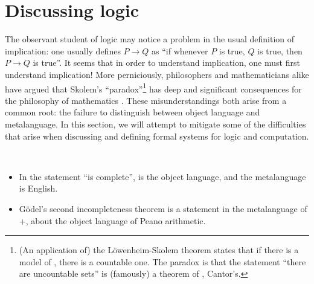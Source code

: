 \documentclass[12pt,twoside]{reedthesis}
\let\oldindex\index
\renewcommand{\index}[1]
               {\oldindex{#1}\marginpar{\footnotesize\color{index}index: #1}}
\newcommand{\define}[1]{\textbf{#1}} %
\newtheorem{notation}[theorem]{Notation}
\begin{document}

\section{Discussing logic}
\label{sec:discussing-logic}

The observant student of logic may notice a problem in the usual definition of
implication: one usually defines $P→ Q$ as ``if whenever $P$ is true,
$Q$ is true, then $P→ Q$ is true''. It seems that in order to understand
implication, one must first understand implication! More perniciously,
philosophers and mathematicians alike have argued that Skolem's
``paradox''\footnote{(An application of) the L\"owenheim-Skolem theorem states
  that if there is a model of \ZFC, there is a countable one.
  The paradox is that the statement ``there are uncountable sets'' is (famously)
  a theorem of \ZFC, Cantor's.}
has deep and significant consequences for the philosophy of
mathematics \cite{skolem}. These misunderstandings both arise from a common
root: the failure to distinguish between object language and metalanguage. In
this section, we will attempt to mitigate some of the difficulties that arise
when discussing and defining formal systems for logic and computation.


\begin{example}
  \
  \begin{itemize}
    \itemsep0em
    \item In the statement ``\FOL is complete'', \FOL
      is the object language, and the metalanguage is English.
    \item G\"odel's second incompleteness theorem is a statement in the
      metalanguage of \FOL+\ZFC, about the object
      language of Peano arithmetic.
  \end{itemize}
\end{example}
\end{document}
